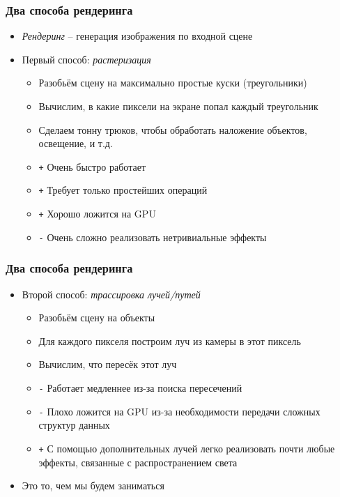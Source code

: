 \documentclass[10pt,handout]{beamer}
\begin{document}
\begin{frame}
\frametitle{Два способа рендеринга}
\begin{itemize}
\item \textit{Рендеринг} -- генерация изображения по входной сцене
\pause
\item Первый способ: \textit{растеризация}
\pause
\begin{itemize}
\item Разобьём сцену на максимально простые куски (треугольники)
\item Вычислим, в какие пиксели на экране попал каждый треугольник
\item Сделаем тонну трюков, чтобы обработать наложение объектов, освещение, и т.д.
\item {\color{green}\texttt{+}} Очень быстро работает
\item {\color{green}\texttt{+}} Требует только простейших операций
\item {\color{green}\texttt{+}} Хорошо ложится на GPU
\item {\color{red}\texttt{-}} Очень сложно реализовать нетривиальные эффекты
\end{itemize}
\end{itemize}
\end{frame}

\begin{frame}
\frametitle{Два способа рендеринга}
\begin{itemize}
\item Второй способ: \textit{трассировка лучей/путей}
\pause
\begin{itemize}
\item Разобьём сцену на объекты
\item Для каждого пикселя построим луч из камеры в этот пиксель
\item Вычислим, что пересёк этот луч
\item {\color{red}\texttt{-}} Работает медленнее из-за поиска пересечений
\item {\color{red}\texttt{-}} Плохо ложится на GPU из-за необходимости передачи сложных структур данных
\item {\color{green}\texttt{+}} С помощью дополнительных лучей легко реализовать почти любые эффекты, связанные с распространением света
\end{itemize}
\pause
\item Это то, чем мы будем заниматься
\end{itemize}
\end{frame}
\end{document}

